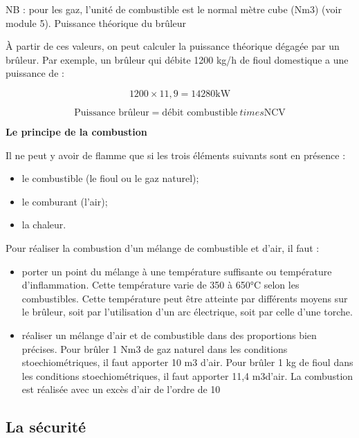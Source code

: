 NB : pour les gaz, l’unité de combustible est le normal mètre cube (Nm3) (voir module 5).
Puissance théorique du brûleur

\vspace{0.3cm}
À partir de ces valeurs, on peut calculer la puissance théorique dégagée par un brûleur.
Par exemple, un brûleur qui débite 1200 kg/h de fioul domestique a une puissance de :

\[
	1200 \times 11,9 = 14 280 \text{kW}
\]

\[
\text{Puissance brûleur} = \text{débit combustible} \ times \text{NCV}
\]

\textbf{Le principe de la combustion}
\vspace{0.3cm}

Il ne peut y avoir de flamme que si les trois éléments suivants sont en présence :
\begin{itemize}
\item  le combustible (le fioul ou le gaz naturel);
\item  le comburant (l’air);
\item  la chaleur.

\end{itemize}


Pour réaliser la combustion d’un mélange de combustible et d’air, il faut :
\begin{itemize}
\item  porter un point du mélange à une température suffisante ou température d’inflammation. Cette température varie de 350 à 650°C selon les combustibles. Cette température peut être atteinte par différents moyens sur le brûleur, soit par l’utilisation d’un arc électrique, soit par celle d’une torche.

\item  réaliser un mélange d’air et de combustible dans des proportions bien précises.
Pour brûler 1 Nm3 de gaz naturel dans les conditions stoechiométriques, il faut apporter 10 m3 d’air.
Pour brûler 1 kg de fioul dans les conditions stoechiométriques, il faut apporter 11,4 m3d’air.
La combustion est réalisée avec un excès d’air de l’ordre de 10%

\end{itemize}

\subsection{La sécurité}

\vspace{0.3cm}

